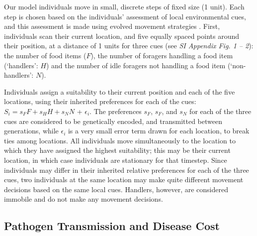 Our model individuals move in small, discrete steps of fixed size (1 unit).
Each step is chosen based on the individuals' assessment of local environmental cues, and this assessment is made using evolved movement strategies \citep[as in][]{netz2021a,gupte2021a}.
First, individuals scan their current location, and five equally spaced points 
around their position, at a distance of 1 units for three cues (see \textit{SI Appendix Fig. 1 -- 2}): the number of food items ($F$), the number of foragers handling a food item (`handlers': $H$) and the number of idle foragers not handling a food item (`non-handlers': $N$).

Individuals assign a suitability \citep[see][]{netz2021a,gupte2021a} to their current position and each of the five locations, using their inherited preferences for each of the cues: $S_i = s_FF + s_HH + s_NN$ + $\epsilon_i$.
The preferences $s_F$, $s_F$, and $s_N$ for each of the three cues are considered to be genetically encoded, and transmitted between generations, while $\epsilon_i$ is a very small error term drawn for each location, to break ties among locations.
All individuals move simultaneously to the location to which they have assigned the highest suitability; this may be their current location, in which case individuals are stationary for that timestep.
Since individuals may differ in their inherited relative preferences for each of the three cues, two individuals at the same location may make quite different movement decisions based on the same local cues.
Handlers, however, are considered immobile and do not make any movement decisions.

\subsection*{Pathogen Transmission and Disease Cost}

